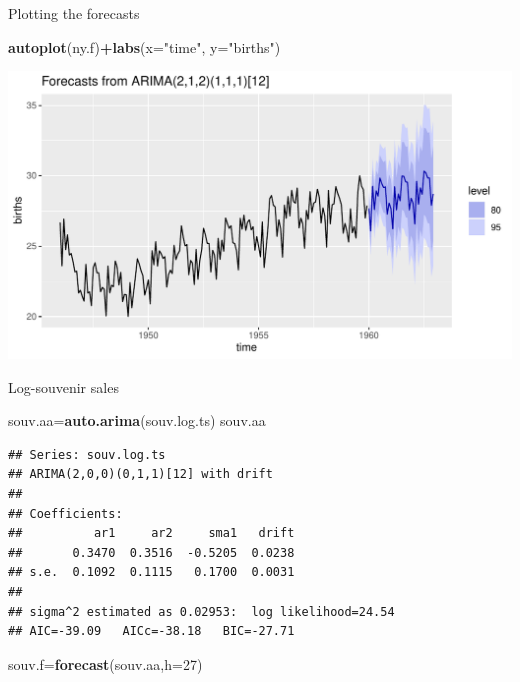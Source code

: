 \documentclass[ignorenonframetext,]{beamer}
\newenvironment{Shaded}{\begin{snugshade}}{\end{snugshade}}
\newcommand{\DataTypeTok}[1]{\textcolor[rgb]{0.13,0.29,0.53}{#1}}
\newcommand{\DecValTok}[1]{\textcolor[rgb]{0.00,0.00,0.81}{#1}}
\newcommand{\KeywordTok}[1]{\textcolor[rgb]{0.13,0.29,0.53}{\textbf{#1}}}
\newcommand{\NormalTok}[1]{#1}
\newcommand{\OperatorTok}[1]{\textcolor[rgb]{0.81,0.36,0.00}{\textbf{#1}}}
\newcommand{\StringTok}[1]{\textcolor[rgb]{0.31,0.60,0.02}{#1}}
\begin{document}
\begin{frame}[fragile]{Plotting the forecasts}
\protect\hypertarget{plotting-the-forecasts}{}

\begin{Shaded}
\begin{Highlighting}[]
\KeywordTok{autoplot}\NormalTok{(ny.f)}\OperatorTok{+}\KeywordTok{labs}\NormalTok{(}\DataTypeTok{x=}\StringTok{"time"}\NormalTok{, }\DataTypeTok{y=}\StringTok{"births"}\NormalTok{)}
\end{Highlighting}
\end{Shaded}

\includegraphics{figure/unnamed-chunk-623-1.pdf}

\end{frame}

\begin{frame}[fragile]{Log-souvenir sales}
\protect\hypertarget{log-souvenir-sales}{}

\begin{Shaded}
\begin{Highlighting}[]
\NormalTok{souv.aa=}\KeywordTok{auto.arima}\NormalTok{(souv.log.ts)}
\NormalTok{souv.aa}
\end{Highlighting}
\end{Shaded}

\begin{verbatim}
## Series: souv.log.ts 
## ARIMA(2,0,0)(0,1,1)[12] with drift 
## 
## Coefficients:
##          ar1     ar2     sma1   drift
##       0.3470  0.3516  -0.5205  0.0238
## s.e.  0.1092  0.1115   0.1700  0.0031
## 
## sigma^2 estimated as 0.02953:  log likelihood=24.54
## AIC=-39.09   AICc=-38.18   BIC=-27.71
\end{verbatim}

\begin{Shaded}
\begin{Highlighting}[]
\NormalTok{souv.f=}\KeywordTok{forecast}\NormalTok{(souv.aa,}\DataTypeTok{h=}\DecValTok{27}\NormalTok{)}
\end{Highlighting}
\end{Shaded}

\end{frame}
\end{document}
